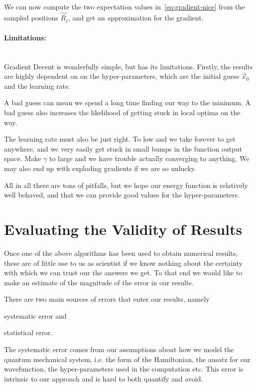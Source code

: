 \documentclass[a4paper, 11pt]{article}
\begin{document}
\begin{multicols}{2}
We can now compute the two expectation values in~\eqref{eq:gradient-nice} from
the sampled positions $\vec R_j$, and get an approximation for the gradient.

\paragraph{Limitations:}$\,$\\
Gradient Decent is wonderfully simple, but has its limitations. Firstly, the
results are highly dependent on on the hyper-parameters, which are the initial
guess $\vec x_0$ and the learning rate.

A bad guess can mean we spend a long time finding our way to the minimum. A bad
guess also increases the likelihood of getting stuck in local optima on the way.

The learning rate must also be just right. To low and we take forever to get
anywhere, and we very easily get stuck in small bumps in the function output
space. Make $\gamma$ to large and we have trouble actually converging to
anything. We may also end up with exploding gradients if we are so unlucky.

All in all there are tons of pitfalls, but we hope our energy function is
relatively well behaved, and that we can provide good values for the
hyper-parameters.

\section{Evaluating the Validity of Results}
\label{sec:statistical-analisys}

Once one of the above algorithms has been used to obtain numerical results,
these are of little use to us as scientist if we know nothing about the
certainty with which we can trust our the answers we get. To that end we would
like to make an estimate of the magnitude of the error in our results.

There are two main sources of errors that enter our results, namely 
\begin{inparaenum}[1)]
    \item systematic error and
    \item statistical error.
\end{inparaenum}
The systematic error comes from our assumptions about how we model the quantum
mechanical system, i.e. the form of the Hamiltonian, the ansatz for our
wavefunction, the hyper-parameters used in the computation etc. This error is
intrinsic to our approach and is hard to both quantify and avoid.


\end{multicols}
\end{document}
